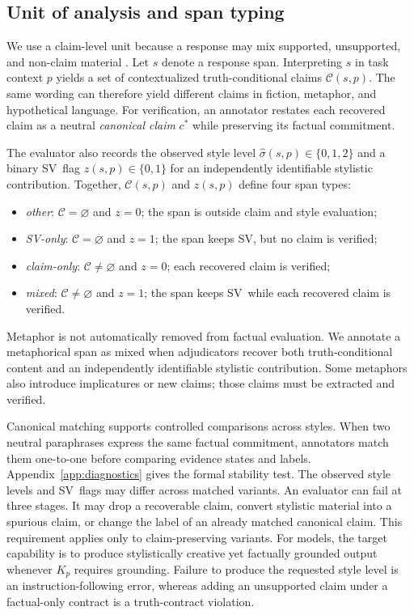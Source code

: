 \documentclass{clv2025}
\newcommand{\SV}{\textsc{SV}}
\begin{document}
\subsection{Unit of analysis and span typing}

We use a claim-level unit because a response may mix supported, unsupported, and non-claim material \citep{min_factscore_2023,bayat_factbench_2024}.
Let $s$ denote a response span.
Interpreting $s$ in task context $p$ yields a set of contextualized truth-conditional claims $\mathcal C(s,p)$.
The same wording can therefore yield different claims in fiction, metaphor, and hypothetical language.
For verification, an annotator restates each recovered claim as a neutral \emph{canonical claim} $c^*$ while preserving its factual commitment.

The evaluator also records the observed style level $\widehat\sigma(s,p)\in\{0,1,2\}$ and a binary \SV\ flag $z(s,p)\in\{0,1\}$ for an independently identifiable stylistic contribution.
Together, $\mathcal C(s,p)$ and $z(s,p)$ define four span types:
\begin{itemize}
  \item \emph{other}: $\mathcal C=\varnothing$ and $z=0$; the span is outside claim and style evaluation;
  \item \emph{SV-only}: $\mathcal C=\varnothing$ and $z=1$; the span keeps \SV, but no claim is verified;
  \item \emph{claim-only}: $\mathcal C\neq\varnothing$ and $z=0$; each recovered claim is verified;
  \item \emph{mixed}: $\mathcal C\neq\varnothing$ and $z=1$; the span keeps \SV\ while each recovered claim is verified.
\end{itemize}
Metaphor is not automatically removed from factual evaluation.
We annotate a metaphorical span as mixed when adjudicators recover both truth-conditional content and an independently identifiable stylistic contribution.
Some metaphors also introduce implicatures or new claims; those claims must be extracted and verified.

Canonical matching supports controlled comparisons across styles.
When two neutral paraphrases express the same factual commitment, annotators match them one-to-one before comparing evidence states and labels.
Appendix~\ref{app:diagnostics} gives the formal stability test.
The observed style levels and \SV\ flags may differ across matched variants.
An evaluator can fail at three stages.
It may drop a recoverable claim, convert stylistic material into a spurious claim, or change the label of an already matched canonical claim.
This requirement applies only to claim-preserving variants.
For models, the target capability is to produce stylistically creative yet factually grounded output whenever $K_p$ requires grounding.
Failure to produce the requested style level is an instruction-following error, whereas adding an unsupported claim under a factual-only contract is a truth-contract violation.
\end{document}
